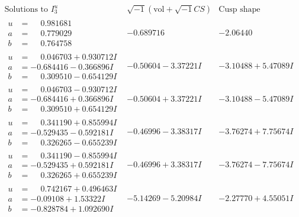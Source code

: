 \documentclass[1p]{elsarticle_modified}
\theoremstyle{definition}
\newcommand{\I}{\sqrt{-1}}
\begin{document}
$$\begin{array}{c|c|c}  
\text{Solutions to }I^u_{3}& \I (\text{vol} + \sqrt{-1}CS) & \text{Cusp shape}\\
 \hline 
\begin{aligned}
u &= \phantom{-}0.981681\phantom{ +0.000000I} \\
a &= \phantom{-}0.779029\phantom{ +0.000000I} \\
b &= \phantom{-}0.764758\phantom{ +0.000000I}\end{aligned}
 & -0.689716\phantom{ +0.000000I} & -2.06440\phantom{ +0.000000I} \\ \hline\begin{aligned}
u &= \phantom{-}0.046703 + 0.930712 I \\
a &= -0.684416 - 0.366896 I \\
b &= \phantom{-}0.309510 - 0.654129 I\end{aligned}
 & -0.50604 - 3.37221 I & -3.10488 + 5.47089 I \\ \hline\begin{aligned}
u &= \phantom{-}0.046703 - 0.930712 I \\
a &= -0.684416 + 0.366896 I \\
b &= \phantom{-}0.309510 + 0.654129 I\end{aligned}
 & -0.50604 + 3.37221 I & -3.10488 - 5.47089 I \\ \hline\begin{aligned}
u &= \phantom{-}0.341190 + 0.855994 I \\
a &= -0.529435 - 0.592181 I \\
b &= \phantom{-}0.326265 - 0.655239 I\end{aligned}
 & -0.46996 - 3.38317 I & -3.76274 + 7.75674 I \\ \hline\begin{aligned}
u &= \phantom{-}0.341190 - 0.855994 I \\
a &= -0.529435 + 0.592181 I \\
b &= \phantom{-}0.326265 + 0.655239 I\end{aligned}
 & -0.46996 + 3.38317 I & -3.76274 - 7.75674 I \\ \hline\begin{aligned}
u &= \phantom{-}0.742167 + 0.496463 I \\
a &= -0.09108 + 1.53322 I \\
b &= -0.828784 + 1.092690 I\end{aligned}
 & -5.14269 - 5.20984 I & -2.27770 + 4.55051 I \\ \hline\begin{aligned}

\end{aligned}
\end{array}$$
\end{document}
